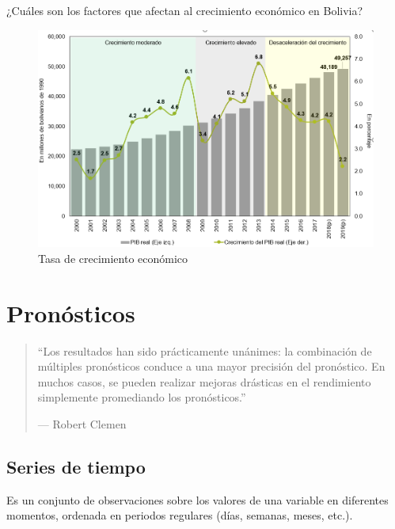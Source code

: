 \documentclass[
]{book}
\begin{document}
¿Cuáles son los factores que afectan al crecimiento económico en Bolivia?

\begin{figure}

{\centering \includegraphics[width=0.8\linewidth]{imagenes/growth} 

}

\caption{Tasa de crecimiento económico}\label{fig:unnamed-chunk-7}
\end{figure}

\hypertarget{pronuxf3sticos}{%
\chapter{Pronósticos}\label{pronuxf3sticos}}

\begin{quote}
``Los resultados han sido prácticamente unánimes: la combinación de múltiples pronósticos conduce a una mayor precisión del pronóstico. En muchos casos, se pueden realizar mejoras drásticas en el rendimiento simplemente promediando los pronósticos.''

--- Robert Clemen
\end{quote}

\hypertarget{series-de-tiempo}{%
\section{Series de tiempo}\label{series-de-tiempo}}

Es un conjunto de observaciones sobre los valores de una variable en diferentes momentos, ordenada en periodos regulares (días, semanas, meses, etc.).
\end{document}
